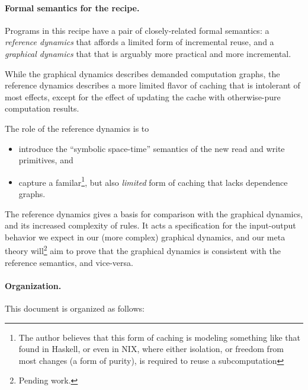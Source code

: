 \documentclass[11pt]{article}
\begin{document}
\paragraph{Formal semantics for the recipe.}
%
Programs in this recipe have a pair of closely-related formal semantics: a
\emph{reference dynamics} that affords a limited form of incremental
reuse, and a \emph{graphical dynamics} that that is arguably more practical
and more incremental.

While the graphical dynamics describes demanded computation graphs, the
reference dynamics describes a more limited flavor of caching that is
intolerant of most effects, except for the effect of updating the
cache with otherwise-pure computation results.

The role of the reference dynamics is to \begin{itemize}
  \item[(1)] introduce the ``symbolic space-time'' semantics
    of the new read and write primitives, and
  \item[(2)] capture a familar\footnote{The author believes that this form of caching is modeling something like that found in Haskell, or even in NIX, where either isolation, or freedom from most changes (a form of purity), is required to reuse a subcomputation}, but also \emph{limited}
    form of caching that lacks dependence graphs.
\end{itemize}

The reference dynamics gives a basis for comparison with the graphical dynamics, and its increased complexity of rules.
    It acts a specification for the input-output behavior we expect in our (more complex) graphical dynamics,
    and our meta theory will\footnote{Pending work.} aim to prove that the graphical dynamics is consistent with the reference semantics, and vice-versa.

\paragraph{Organization.}
This document is organized as follows:
\end{document}
